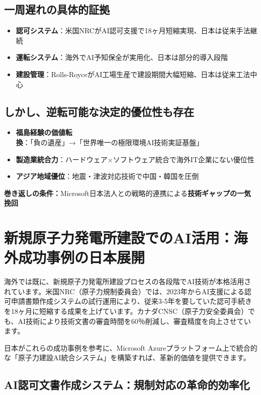 \documentclass[10pt,a4paper]{jsarticle}
\begin{document}
\subsection{一周遅れの具体的証拠}
\begin{itemize}
    \item \textbf{認可システム}：米国NRCがAI認可支援で18ヶ月短縮実現、日本は従来手法継続
    \item \textbf{運転システム}：海外でAI予知保全が実用化、日本は部分的導入段階
    \item \textbf{建設管理}：Rolls-RoyceがAI工場生産で建設期間大幅短縮、日本は従来工法中心
\end{itemize}

\subsection{しかし、逆転可能な決定的優位性も存在}
\begin{itemize}
    \item \textbf{福島経験の価値転換}：「負の遺産」→「世界唯一の極限環境AI技術実証基盤」
    \item \textbf{製造業統合力}：ハードウェア×ソフトウェア統合で海外IT企業にない優位性
    \item \textbf{アジア地域優位}：地震・津波対応技術で中国・韓国を圧倒
\end{itemize}

\textbf{巻き返しの条件：}Microsoft日本法人との戦略的連携による\textbf{技術ギャップの一気挽回}

\section{新規原子力発電所建設でのAI活用：海外成功事例の日本展開}

海外では既に、新規原子力発電所建設プロセスの各段階でAI技術が本格活用されています。米国NRC（原子力規制委員会）では、2023年からAI支援による認可申請書類作成システムの試行運用により、従来3-5年を要していた認可手続きを18ヶ月に短縮する成果を上げています\cite{ans2025}。カナダCNSC（原子力安全委員会）でも、AI技術により技術文書の審査時間を60％削減し、審査精度を向上させています。

日本がこれらの成功事例を参考に、Microsoft Azureプラットフォーム上で統合的な「原子力建設AI統合システム」を構築すれば、革新的価値を提供できます。

\subsection{AI認可文書作成システム：規制対応の革命的効率化}
\end{document}
